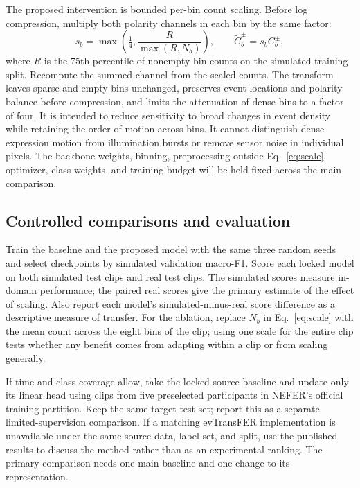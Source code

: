 The proposed intervention is bounded per-bin count scaling. Before log compression, multiply both polarity channels in each bin by the same factor:
\begin{equation}
  s_b = \max\!\left(\tfrac{1}{4},
       \frac{R}{\max(R,N_b)}\right),\qquad
  \widetilde{C}_b^{\pm}=s_b C_b^{\pm},
  \label{eq:scale}
\end{equation}
where $R$ is the 75th percentile of nonempty bin counts on the simulated training split. Recompute the summed channel from the scaled counts. The transform leaves sparse and empty bins unchanged, preserves event locations and polarity balance before compression, and limits the attenuation of dense bins to a factor of four. It is intended to reduce sensitivity to broad changes in event density while retaining the order of motion across bins. It cannot distinguish dense expression motion from illumination bursts or remove sensor noise in individual pixels. The backbone weights, binning, preprocessing outside Eq.~\eqref{eq:scale}, optimizer, class weights, and training budget will be held fixed across the main comparison.

\subsection{Controlled comparisons and evaluation}
Train the baseline and the proposed model with the same three random seeds and select checkpoints by simulated validation macro-F1. Score each locked model on both simulated test clips and real test clips. The simulated scores measure in-domain performance; the paired real scores give the primary estimate of the effect of scaling. Also report each model's simulated-minus-real score difference as a descriptive measure of transfer. For the ablation, replace $N_b$ in Eq.~\eqref{eq:scale} with the mean count across the eight bins of the clip; using one scale for the entire clip tests whether any benefit comes from adapting within a clip or from scaling generally.

If time and class coverage allow, take the locked source baseline and update only its linear head using clips from five preselected participants in NEFER's official training partition. Keep the same target test set; report this as a separate limited-supervision comparison. If a matching evTransFER implementation is unavailable under the same source data, label set, and split, use the published results to discuss the method rather than as an experimental ranking. The primary comparison needs one main baseline and one change to its representation.

